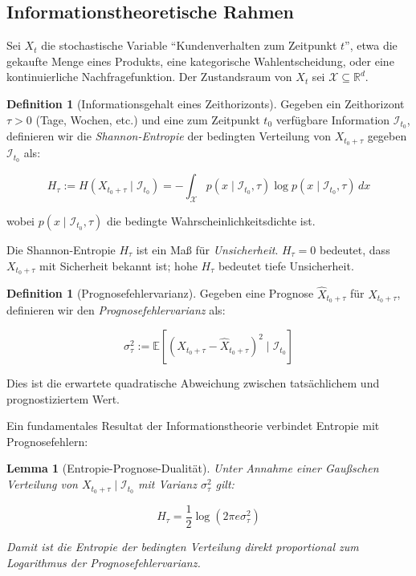 \documentclass[a4paper, 12pt, twoside, openright]{report}
\newtheorem{lemma}[theorem]{Lemma}
\theoremstyle{definition}
\newtheorem{definition}[theorem]{Definition}
\theoremstyle{definition}
\newcommand{\R}{\mathbb{R}}
\newcommand{\E}{\mathbb{E}}
\begin{document}
\subsection{Informationstheoretische Rahmen}

Sei $X_t$ die stochastische Variable ``Kundenverhalten zum Zeitpunkt $t$'', etwa die gekaufte Menge eines Produkts, eine kategorische Wahlentscheidung, oder eine kontinuierliche Nachfragefunktion. Der Zustandsraum von $X_t$ sei $\mathcal{X} \subseteq \R^d$.

\begin{definition}[Informationsgehalt eines Zeithorizonts]
Gegeben ein Zeithorizont $\tau > 0$ (Tage, Wochen, etc.) und eine zum Zeitpunkt $t_0$ verfügbare Information $\mathcal{I}_{t_0}$, definieren wir die \emph{Shannon-Entropie} der bedingten Verteilung von $X_{t_0+\tau}$ gegeben $\mathcal{I}_{t_0}$ als:

\begin{equation}
H_\tau := H(X_{t_0+\tau} \mid \mathcal{I}_{t_0}) = -\int_{\mathcal{X}} p(x \mid \mathcal{I}_{t_0}, \tau) \log p(x \mid \mathcal{I}_{t_0}, \tau) \, dx
\label{eq:entropy}
\end{equation}

wobei $p(x \mid \mathcal{I}_{t_0}, \tau)$ die bedingte Wahrscheinlichkeitsdichte ist.
\end{definition}

Die Shannon-Entropie $H_\tau$ ist ein Maß für \emph{Unsicherheit}. $H_\tau = 0$ bedeutet, dass $X_{t_0+\tau}$ mit Sicherheit bekannt ist; hohe $H_\tau$ bedeutet tiefe Unsicherheit.

\begin{definition}[Prognosefehlervarianz]
Gegeben eine Prognose $\hat{X}_{t_0+\tau}$ für $X_{t_0+\tau}$, definieren wir den \emph{Prognosefehlervarianz} als:

\begin{equation}
\sigma_\tau^2 := \E\left[ \left( X_{t_0+\tau} - \hat{X}_{t_0+\tau} \right)^2 \mid \mathcal{I}_{t_0} \right]
\label{eq:mse}
\end{equation}

Dies ist die erwartete quadratische Abweichung zwischen tatsächlichem und prognostiziertem Wert.
\end{definition}

Ein fundamentales Resultat der Informationstheorie verbindet Entropie mit Prognosefehlern:

\begin{lemma}[Entropie-Prognose-Dualität]
Unter Annahme einer Gaußschen Verteilung von $X_{t_0+\tau} \mid \mathcal{I}_{t_0}$ mit Varianz $\sigma_\tau^2$ gilt:

\begin{equation}
H_\tau = \frac{1}{2} \log(2\pi e \sigma_\tau^2)
\label{eq:entropie_varianz}
\end{equation}

Damit ist die Entropie der bedingten Verteilung direkt proportional zum Logarithmus der Prognosefehlervarianz.
\end{lemma}
\end{document}
